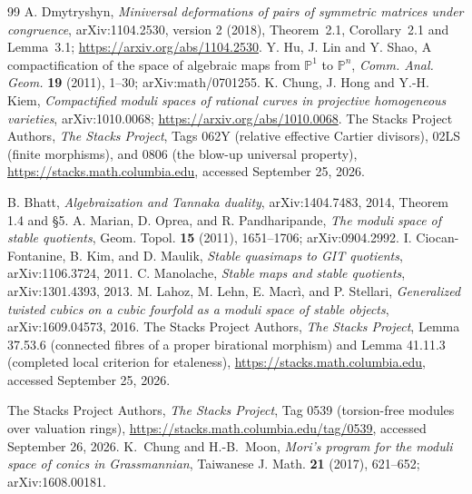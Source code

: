 \documentclass[11pt,reqno]{amsart}
\numberwithin{equation}{section}
\theoremstyle{definition}\newtheorem{definition}[theorem]{Definition}
\theoremstyle{remark}\newtheorem{remark}[theorem]{Remark}
\newcommand{\Pj}{\mathbb P}\newcommand{\A}{\mathbb A}
\begin{document}
\begin{thebibliography}{99}
A. Dmytryshyn, \emph{Miniversal deformations of pairs of symmetric
matrices under congruence}, arXiv:1104.2530, version 2 (2018),
Theorem~2.1, Corollary~2.1 and Lemma~3.1;
\url{https://arxiv.org/abs/1104.2530}.
Y. Hu, J. Lin and Y. Shao, A compactification of the space of algebraic
maps from $\Pj^1$ to $\Pj^n$, \emph{Comm. Anal. Geom.}
\textbf{19} (2011), 1--30; arXiv:math/0701255.
K. Chung, J. Hong and Y.-H. Kiem, \emph{Compactified moduli spaces
of rational curves in projective homogeneous varieties},
arXiv:1010.0068; \url{https://arxiv.org/abs/1010.0068}.
The Stacks Project Authors, \emph{The Stacks Project},
Tags 062Y (relative effective Cartier divisors), 02LS (finite morphisms),
and 0806 (the blow-up universal property),
\url{https://stacks.math.columbia.edu}, accessed September 25, 2026.

B. Bhatt, \emph{Algebraization and Tannaka duality},
arXiv:1404.7483, 2014, Theorem 1.4 and \S5.
A. Marian, D. Oprea, and R. Pandharipande,
\emph{The moduli space of stable quotients}, Geom. Topol.
\textbf{15} (2011), 1651--1706; arXiv:0904.2992.
I. Ciocan-Fontanine, B. Kim, and D. Maulik,
\emph{Stable quasimaps to GIT quotients}, arXiv:1106.3724, 2011.
C. Manolache, \emph{Stable maps and stable quotients},
arXiv:1301.4393, 2013.
M. Lahoz, M. Lehn, E. Macr\`i, and P. Stellari,
\emph{Generalized twisted cubics on a cubic fourfold as a moduli
space of stable objects}, arXiv:1609.04573, 2016.
The Stacks Project Authors, \emph{The Stacks Project},
Lemma 37.53.6 (connected fibres of a proper birational morphism)
and Lemma 41.11.3 (completed local criterion for etaleness),
\url{https://stacks.math.columbia.edu}, accessed September 25, 2026.

The Stacks Project Authors, \emph{The Stacks Project},
Tag 0539 (torsion-free modules over valuation rings),
\url{https://stacks.math.columbia.edu/tag/0539}, accessed September 26, 2026.
K.~Chung and H.-B.~Moon, \emph{Mori's program for the moduli space
of conics in Grassmannian}, Taiwanese J. Math. \textbf{21} (2017),
621--652; arXiv:1608.00181.


\end{thebibliography}
\end{document}
